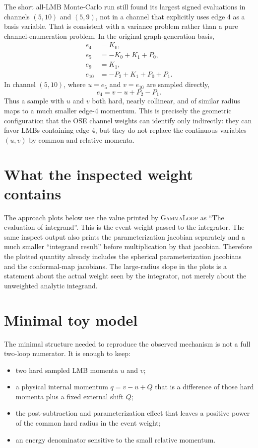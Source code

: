 \documentclass[11pt]{article}
\newcommand{\GL}{\textsc{GammaLoop}}
\begin{document}
The short all-LMB Monte-Carlo run still found its largest signed evaluations in
channels $(5,10)$ and $(5,9)$, not in a channel that explicitly uses edge 4 as
a basis variable.  That is consistent with a variance problem rather than a
pure channel-enumeration problem.  In the original graph-generation basis,
\begin{align}
e_4 &= K_0,\\
e_5 &= -K_0 + K_1 + P_0,\\
e_9 &= K_1,\\
e_{10} &= -P_2 + K_1 + P_0 + P_1.
\end{align}
In channel $(5,10)$, where $u=e_5$ and $v=e_{10}$ are sampled directly,
\begin{equation}
  e_4 = v-u+P_2-P_1 .
  \label{eq:e4-difference}
\end{equation}
Thus a sample with $u$ and $v$ both hard, nearly collinear, and of similar
radius maps to a much smaller edge-4 momentum.  This is precisely the geometric
configuration that the OSE channel weights can identify only indirectly: they
can favor LMBs containing edge 4, but they do not replace the continuous
variables $(u,v)$ by common and relative momenta.

\section{What the inspected weight contains}

The approach plots below use the value printed by \GL{} as
``The evaluation of integrand''.  This is the event weight passed to the
integrator.  The same inspect output also prints the parameterization jacobian
separately and a much smaller ``integrand result'' before multiplication by that
jacobian.  Therefore the plotted quantity already includes the spherical
parameterization jacobians and the conformal-map jacobians.  The large-radius
slope in the plots is a statement about the actual weight seen by the
integrator, not merely about the unweighted analytic integrand.

\section{Minimal toy model}

The minimal structure needed to reproduce the observed mechanism is not a full
two-loop numerator.  It is enough to keep:
\begin{itemize}
  \item two hard sampled LMB momenta $u$ and $v$;
  \item a physical internal momentum $q=v-u+Q$ that is a difference of those
        hard momenta plus a fixed external shift $Q$;
  \item the post-subtraction and parameterization effect that leaves a positive
        power of the common hard radius in the event weight;
  \item an energy denominator sensitive to the small relative momentum.
\end{itemize}
\end{document}
